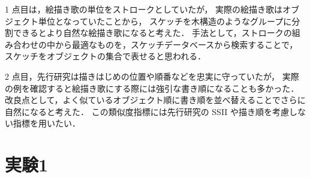 \documentclass[twocolumn]{jarticle}     %
\begin{document}
1 点目は，絵描き歌の単位をストロークとしていたが，
実際の絵描き歌はオブジェクト単位となっていたことから，
スケッチを木構造のようなグループに分割できるとより自然な絵描き歌になると考えた．
手法として，ストロークの組み合わせの中から最適なものを，スケッチデータベースから検索することで，
スケッチをオブジェクトの集合で表せると思われる．

2 点目，先行研究は描きはじめの位置や順番などを忠実に守っていたが，
実際の例を確認すると絵描き歌にする際には強引な書き順になることも多かった．
改良点として，よく似ているオブジェクト順に書き順を並べ替えることでさらに自然になると考えた．
この類似度指標には先行研究の SSII や描き順を考慮しない指標を用いたい．



\section{実験1}
\end{document}
